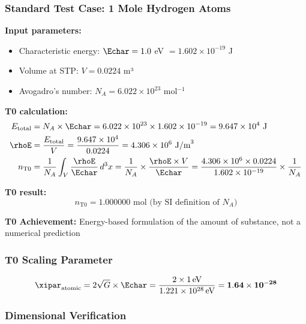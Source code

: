 	\subsubsection{Standard Test Case: 1 Mole Hydrogen Atoms}
	\label{subsubsec:mol_hydrogen_test}
	
	\textbf{Input parameters:}
	\begin{itemize}
		\item Characteristic energy: $\Echar = 1.0$ eV $= 1.602 \times 10^{-19}$ J
		\item Volume at STP: $V = 0.0224$ m³
		\item Avogadro's number: $N_A = 6.022 \times 10^{23}$ mol$^{-1}$
	\end{itemize}
	
	\textbf{T0 calculation:}
	\begin{align}
		E_{\text{total}} &= N_A \times \Echar = 6.022 \times 10^{23} \times 1.602 \times 10^{-19} = 9.647 \times 10^{4} \text{ J} \\
		\rhoE &= \frac{E_{\text{total}}}{V} = \frac{9.647 \times 10^{4}}{0.0224} = 4.306 \times 10^{6} \text{ J/m}^3 \\
		n_{\text{T0}} &= \frac{1}{N_A} \int_V \frac{\rhoE}{\Echar} \, d^3x = \frac{1}{N_A} \times \frac{\rhoE \times V}{\Echar} = \frac{4.306 \times 10^{6} \times 0.0224}{1.602 \times 10^{-19}} \times \frac{1}{N_A}
	\end{align}
	
	\textbf{T0 result:}
	\begin{equation}
		\boxed{n_{\text{T0}} = 1.000000 \text{ mol (by SI definition of } N_A\text{)}}
		\label{eq:mol_t0_result}
	\end{equation}
	
	\textbf{T0 Achievement:} Energy-based formulation of the amount of substance, not a numerical prediction
	
	\subsubsection{T0 Scaling Parameter}
	\label{subsubsec:mol_scaling_parameter}
	
	\begin{equation}
		\xipar_{\text{atomic}} = 2\sqrt{G} \times \Echar = \frac{2 \times 1\,\text{eV}}{1.221 \times 10^{28}\,\text{eV}} = \mathbf{1.64 \times 10^{-28}}
		\label{eq:xi_atomic_calculated}
	\end{equation}
	
	\subsubsection{Dimensional Verification}
	\label{subsubsec:mol_dimensional_verification}
	
